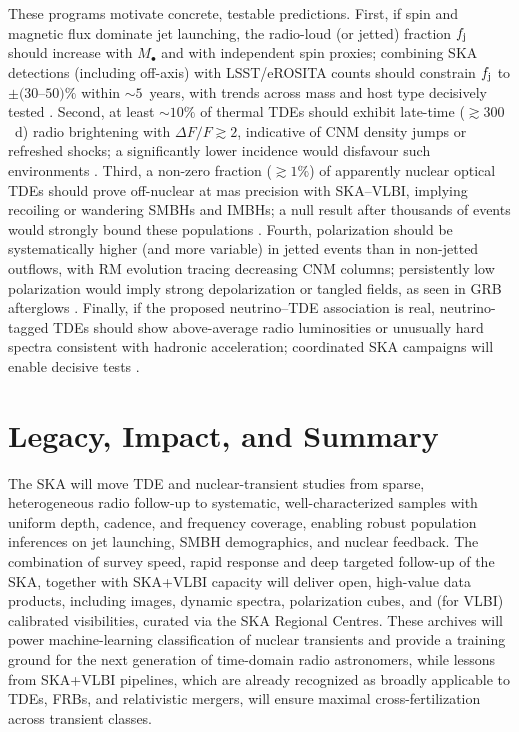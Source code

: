 \documentclass[a4paper,11pt]{article}
\begin{document}
These programs motivate concrete, testable predictions. First, if spin and magnetic flux dominate jet launching, the radio-loud (or jetted) fraction $f_{\rm j}$ should increase with $M_\bullet$ and with independent spin proxies; combining SKA detections (including off-axis) with LSST/eROSITA counts should constrain $f_{\rm j}$ to $\pm (30$--$50)\%$ within $\sim 5$~years, with trends across mass and host type decisively tested \citep{Ivezic2019,vanVelzen2021}. Second, at least $\sim 10\%$ of thermal TDEs should exhibit late-time ($\gtrsim 300$~d) radio brightening with $\Delta F/F\gtrsim 2$, indicative of CNM density jumps or refreshed shocks; a significantly lower incidence would disfavour such environments \citep{Cendes2022,Goodwin2022}. Third, a non-zero fraction ($\gtrsim 1\%$) of apparently nuclear optical TDEs should prove off-nuclear at mas precision with SKA--VLBI, implying recoiling or wandering SMBHs and IMBHs; a null result after thousands of events would strongly bound these populations \citep{Paragi2015,Lin2018}. Fourth, polarization should be systematically higher (and more variable) in jetted events than in non-jetted outflows, with RM evolution tracing decreasing CNM columns; persistently low polarization would imply strong depolarization or tangled fields, as seen in GRB afterglows \citep{Granot2003}. Finally, if the proposed neutrino--TDE association is real, neutrino-tagged TDEs should show above-average radio luminosities or unusually hard spectra consistent with hadronic acceleration; coordinated SKA campaigns will enable decisive tests \citep{Stein2021, Reusch2022}.



\section{Legacy, Impact, and Summary}

The SKA will move TDE and nuclear-transient studies from sparse, heterogeneous radio follow-up to systematic, well-characterized samples with uniform depth, cadence, and frequency coverage, enabling robust population inferences on jet launching, SMBH demographics, and nuclear feedback. The combination of survey speed, rapid response and deep targeted follow-up of the SKA, together with SKA+VLBI capacity will deliver open, high-value data products, including images, dynamic spectra, polarization cubes, and (for VLBI) calibrated visibilities, curated via the SKA Regional Centres. These archives will power machine-learning classification of nuclear transients and provide a training ground for the next generation of time-domain radio astronomers, while lessons from SKA+VLBI pipelines, which are already recognized as broadly applicable to TDEs, FRBs, and relativistic mergers, will ensure maximal cross-fertilization across transient classes.
\end{document}
